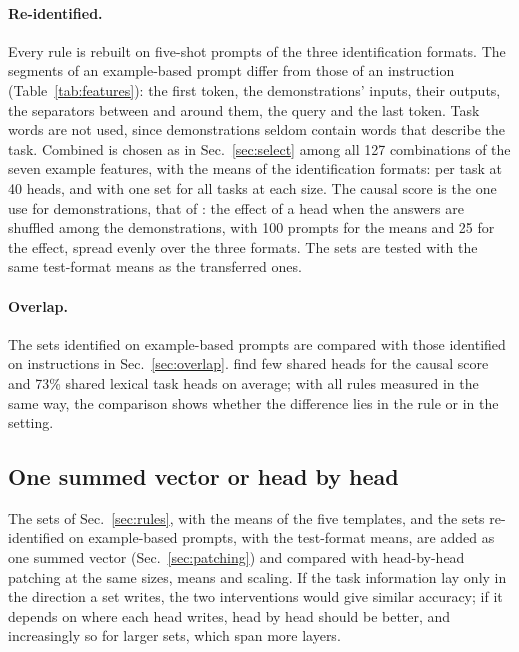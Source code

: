 \documentclass[10pt,a4paper]{article}
\begin{document}
\paragraph{Re-identified.} Every rule is rebuilt on five-shot prompts of the three identification formats. The segments of an example-based prompt differ from those of an instruction (Table~\ref{tab:features}): the first token, the demonstrations' inputs, their outputs, the separators between and around them, the query and the last token. Task words are not used, since demonstrations seldom contain words that describe the task. Combined is chosen as in Sec.~\ref{sec:select} among all 127 combinations of the seven example features, with the means of the identification formats: per task at 40 heads, and with one set for all tasks at each size. The causal score is the one \citet{davidson2025different} use for demonstrations, that of \citet{todd2024function}: the effect of a head when the answers are shuffled among the demonstrations, with 100 prompts for the means and 25 for the effect, spread evenly over the three formats. The sets are tested with the same test-format means as the transferred ones.

\paragraph{Overlap.} The sets identified on example-based prompts are compared with those identified on instructions in Sec.~\ref{sec:overlap}. \citet{davidson2025different} find few shared heads for the causal score and \citet{yang2026shared} 73\% shared lexical task heads on average; with all rules measured in the same way, the comparison shows whether the difference lies in the rule or in the setting.

\subsection{One summed vector or head by head}\label{sec:summed}

The sets of Sec.~\ref{sec:rules}, with the means of the five templates, and the sets re-identified on example-based prompts, with the test-format means, are added as one summed vector (Sec.~\ref{sec:patching}) and compared with head-by-head patching at the same sizes, means and scaling. If the task information lay only in the direction a set writes, the two interventions would give similar accuracy; if it depends on where each head writes, head by head should be better, and increasingly so for larger sets, which span more layers.
\end{document}
